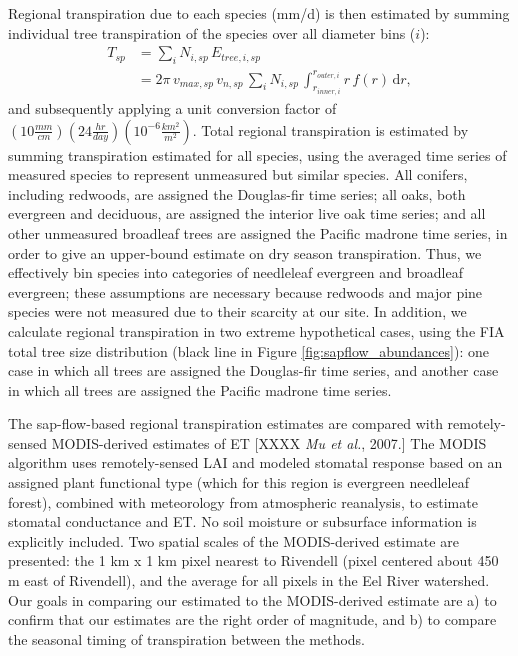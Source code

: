 Regional transpiration due to each species (mm/d) is then estimated by summing individual tree transpiration of the species over all diameter bins ($i$):
\begin{align}
\label{eqn:transpreg}
T_{sp} &= \sum_{i} N_{i,sp} \, E_{tree,i,sp} \nonumber \\
&= 2\pi \, v_{max,sp} \, v_{n,sp} \, \sum_{i} N_{i,sp} \, \int_{r_{inner,i}}^{r_{outer,i}}  r \, f(r) \, \mathrm{d}r ,
\end{align}
and subsequently applying a unit conversion factor of $(10 \tfrac{mm}{cm}) (24 \tfrac{hr}{day}) (10^{-6} \tfrac{km^2}{m^2})$.  Total regional transpiration is estimated by summing transpiration estimated for all species, using the averaged time series of measured species to represent unmeasured but similar species.  All conifers, including redwoods, are assigned the Douglas-fir time series; all oaks, both evergreen and deciduous, are assigned the interior live oak time series; and all other unmeasured broadleaf trees are assigned the Pacific madrone time series, in order to give an upper-bound estimate on dry season transpiration.  Thus, we effectively bin species into categories of needleleaf evergreen and broadleaf evergreen; these assumptions are necessary because redwoods and major pine species were not measured due to their scarcity at our site.  In addition, we calculate regional transpiration in two extreme hypothetical cases, using the FIA total tree size distribution (black line in Figure \ref{fig:sapflow_abundances}): one case in which all trees are assigned the Douglas-fir time series, and another case in which all trees are assigned the Pacific madrone time series. 

The sap-flow-based regional transpiration estimates are compared with remotely-sensed MODIS-derived estimates of ET [XXXX \textit{Mu et al.}, 2007.]  The MODIS algorithm uses remotely-sensed LAI and modeled stomatal response based on an assigned plant functional type (which for this region is evergreen needleleaf forest), combined with meteorology from atmospheric reanalysis, to estimate stomatal conductance and ET.  No soil moisture or subsurface information is explicitly included.  Two spatial scales of the MODIS-derived estimate are presented: the 1 km x 1 km pixel nearest to Rivendell (pixel centered about 450 m east of Rivendell), and the average for all pixels in the Eel River watershed.  Our goals in comparing our estimated to the MODIS-derived estimate are a) to confirm that our estimates are the right order of magnitude, and b) to compare the seasonal timing of transpiration between the methods.

